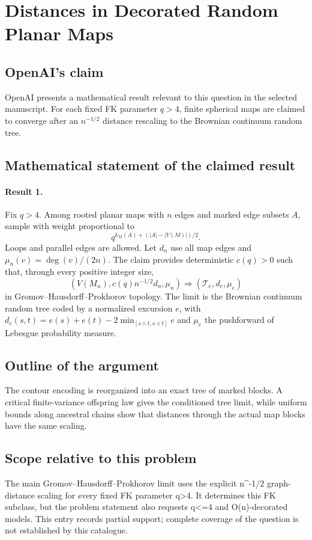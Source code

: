 \documentclass[11pt]{article}
\begin{document}
\section*{Distances in Decorated Random Planar Maps}

\subsection{OpenAI's claim}
OpenAI presents a mathematical result relevant to this question in the selected manuscript. For each fixed FK parameter $q>4$, finite spherical maps are claimed to converge after an $n^{-1/2}$ distance rescaling to the Brownian continuum random tree.

\subsection{Mathematical statement of the claimed result}
\paragraph{Result 1.} Fix \(q>4\). Among rooted planar maps with \(n\) edges and marked edge subsets \(A\), sample with weight proportional to
\[
 q^{k_M(A)+(|A|-|V(M)|)/2}.
\]
Loops and parallel edges are allowed. Let \(d_n\) use all map edges and \(\mu_n(v)=\deg(v)/(2n)\). The claim provides deterministic \(c(q)>0\) such that, through every positive integer size,
\[
 (V(M_n),c(q)n^{-1/2}d_n,\mu_n)
 \Longrightarrow(\mathcal T_e,d_e,\mu_e)
\]
in Gromov--Hausdorff--Prokhorov topology. The limit is the Brownian continuum random tree coded by a normalized excursion \(e\), with \(d_e(s,t)=e(s)+e(t)-2\min_{[s\wedge t,s\vee t]}e\) and \(\mu_e\) the pushforward of Lebesgue probability measure.

\subsection{Outline of the argument}
The contour encoding is reorganized into an exact tree of marked blocks. A critical finite-variance offspring law gives the conditioned tree limit, while uniform bounds along ancestral chains show that distances through the actual map blocks have the same scaling.

\subsection{Scope relative to this problem}
The main Gromov–Hausdorff–Prokhorov limit uses the explicit n\textasciicircum{}-1/2 graph-distance scaling for every fixed FK parameter q>4. It determines this FK subclass, but the problem statement also requests q<=4 and O(n)-decorated models. This entry records partial support; complete coverage of the question is not established by this catalogue.
\end{document}
